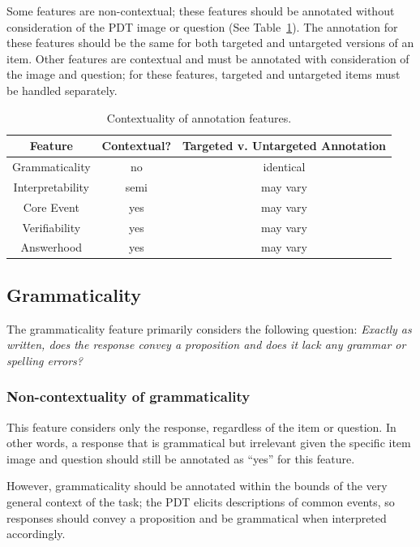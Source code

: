 \documentclass[12pt,notitlepage]{article}
\begin{document}
Some features are non-contextual; these features should be annotated without consideration of the PDT image or question (See Table~\ref{tab:annotation-features}). The annotation for these features should be the same for both targeted and untargeted versions of an item. Other features are contextual and must be annotated with consideration of the image and question; for these features, targeted and untargeted items must be handled separately.

\begin{table}[h]
\begin{center}
\begin{tabular}{|c|c|c|}
\hline
Feature & Contextual? & Targeted v. Untargeted Annotation \\
\hline
\hline
Grammaticality & no & identical \\
\hline
Interpretability & semi & may vary \\
\hline
Core Event & yes & may vary \\
\hline
Verifiability & yes & may vary \\
\hline
Answerhood & yes & may vary \\
\hline
\end{tabular}
\end{center}
\caption{Contextuality of annotation features.}
\label{tab:annotation-features}
\end{table}


\subsection{Grammaticality} \label{subsec:grammaticality}
The grammaticality feature primarily considers the following question: \textit{Exactly as written, does the response convey a proposition and does it lack any grammar or spelling errors?}

\subsubsection{Non-contextuality of grammaticality} This feature considers only the response, regardless of the item or question. In other words, a response that is grammatical but  irrelevant given the specific item image and question should still be annotated as ``yes'' for this feature.

However, grammaticality should be annotated within the bounds of the very general context of the task; the PDT elicits descriptions of common events, so responses should convey a proposition and be grammatical when interpreted accordingly.
\end{document}
